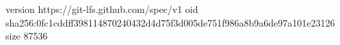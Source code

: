 version https://git-lfs.github.com/spec/v1
oid sha256:0fc1cddff398114870240432d4d75f3d005de751f986a8b9a6de97a101e23126
size 87536
